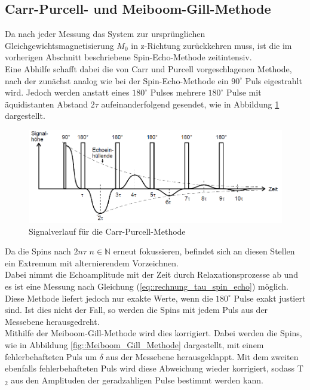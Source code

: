 \documentclass[]{scrartcl}
\begin{document}
\subsection{Carr-Purcell- und Meiboom-Gill-Methode}
Da nach jeder Messung das System zur ursprünglichen Gleichgewichtsmagnetisierung $M_0$ in z-Richtung zurückkehren muss, ist die im vorherigen Abschnitt beschriebene Spin-Echo-Methode zeitintensiv.\\
Eine Abhilfe schafft dabei die von Carr und Purcell vorgeschlagenen Methode, nach der zunächst analog wie bei der Spin-Echo-Methode ein $90^\circ$ Puls eigestrahlt wird. Jedoch werden anstatt eines $180^\circ$ Pulses mehrere $180^\circ$ Pulse mit äquidistanten Abstand $2\tau$ aufeinanderfolgend gesendet, wie in Abbildung \ref{fig::Carr_Purcellt_signal} dargestellt.
\begin{figure}[H]
\centering
\includegraphics[width=14cm]{images/Carr_Purcellt_signal.png}
\caption{Signalverlauf für die Carr-Purcell-Methode}
\label{fig::Carr_Purcellt_signal}
\end{figure}
Da die Spins nach $2n\tau$ $n\in \mathbb{N}$ erneut fokussieren, befindet sich an diesen Stellen ein Extremum mit alternierendem Vorzeichnen.\\
Dabei nimmt die Echoamplitude mit der Zeit durch Relaxationsprozesse ab und es ist eine Messung nach Gleichung (\ref{eq::rechnung_tau_spin_echo}) möglich.\\
Diese Methode liefert jedoch nur exakte Werte, wenn die $180^\circ$ Pulse exakt justiert sind. Ist dies nicht der Fall, so werden die Spins mit jedem Puls aus der Messebene herausgedreht.\\ Mithilfe der Meiboom-Gill-Methode wird dies korrigiert. Dabei werden die Spins, wie in Abbildung \ref{fig::Meiboom_Gill_Methode} dargestellt, mit einem fehlerbehafteten Puls um $\delta$ aus der Messebene herausgeklappt. Mit dem zweiten ebenfalls fehlerbehafteten Puls wird diese Abweichung wieder korrigiert, sodass T$_2$ aus den Amplituden der geradzahligen Pulse bestimmt werden kann.
\end{document}
